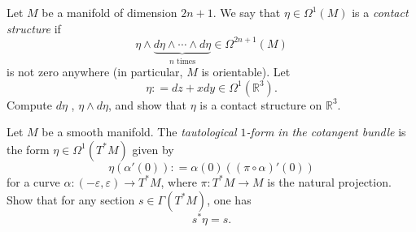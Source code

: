 \documentclass{ximera}
\begin{document}
    \begin{exercise}
     Let $M$ be a manifold of dimension $2n +1$. We say that $\eta \in \Omega ^1 (M)$ is a \emph{contact structure} if 
    \[     \eta \wedge \underbrace{ d \eta \wedge \cdots  \wedge d \eta }_{n \text{ times}} \in \Omega ^{2n + 1} (M)          \]
    is not zero anywhere (in particular, $M$ is orientable). Let 
    \[       \eta : = d z + x dy \in \Omega ^1 (\mathbb{R}^3)  .              \]
     Compute $d\eta $ , $\eta \wedge d \eta$, and show that $\eta$ is a contact structure on $\mathbb{R}^3$. 
    
    \end{exercise}


\begin{exercise}
     Let $M$ be a smooth manifold. The \emph{tautological $1$-form in the cotangent bundle} is the form $\eta \in \Omega ^1 (T^{\ast}M) $ given by 
    \[   \eta (\alpha ' (0) ) : = \alpha(0) ( (\pi \circ \alpha )' (0)  )           \]
     for a curve $\alpha : (- \varepsilon , \varepsilon ) \to T^{\ast}M $, where $\pi : T^{\ast} M \to M$ is the natural projection. Show that for any section $s \in \Gamma (T^{\ast}M)$, one has 
     \[   s ^{\ast} \eta = s  .    \]
     

\end{exercise}
    
\end{document}
